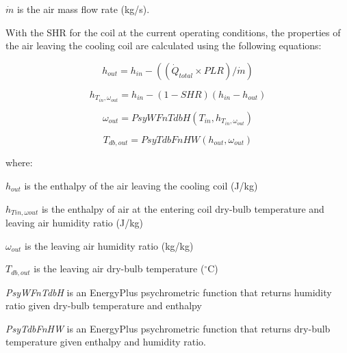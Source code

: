 \(\dot m\) is the air mass flow rate (kg/s).

With the SHR for the coil at the current operating conditions, the properties of the air leaving the cooling coil are calculated using the following equations:

\begin{equation}
h_{out} = h_{in} - \left( \left( \dot{Q}_{total} \times PLR \right) / \dot{m} \right)
\end{equation}

\begin{equation}
{h_{T_{in},\omega_{out}}} = {h_{in}} - \left( {1 - SHR} \right)\left( {{h_{in}} - {h_{out}}} \right)
\end{equation}

\begin{equation}
{\omega_{out}} = PsyWFnTdbH\left( {{T_{in}},{h_{T_{in},\omega_{out}}}} \right)
\end{equation}

\begin{equation}
{T_{db,out}} = PsyTdbFnHW\left( {{h_{out}},{\omega_{out}}} \right)
\end{equation}

where:

\({{h_{out}}}\) is the enthalpy of the air leaving the cooling coil (J/kg)

\({{h_{Tin,\omega out}}}\) is the enthalpy of air at the entering coil dry-bulb temperature and leaving air humidity ratio (J/kg)

\({{\omega_{out}}}\) is the leaving air humidity ratio (kg/kg)

\({T_{db,out}}\) is the leaving air dry-bulb temperature (\(^{\circ}\)C)

\emph{PsyWFnTdbH} is an EnergyPlus psychrometric function that returns humidity ratio given dry-bulb temperature and enthalpy

\emph{PsyTdbFnHW} is an EnergyPlus psychrometric function that returns dry-bulb temperature given enthalpy and humidity ratio.

